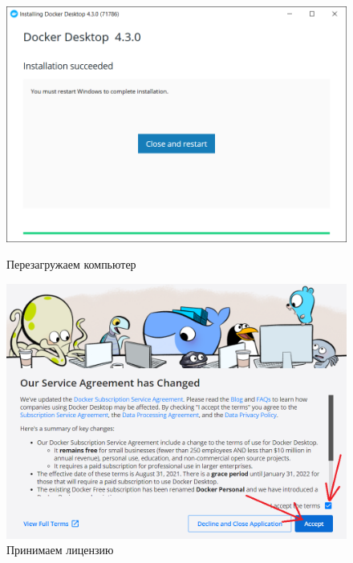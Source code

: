 \begin{figure}[!p]
    \centering
    \begin{minipage}{0.47\textwidth}
        \centering
        \includegraphics[width=\linewidth]
            {_assets/gpi_pz_docker_05.png}
        \caption{Перезагружаем компьютер}
        \label{fig:gpi_pz_docker_05}
    \end{minipage}
    \begin{minipage}{0.47\textwidth}
        \centering
        \includegraphics[width=\linewidth]
            {_assets/gpi_pz_docker_06.png}
        \caption{Принимаем лицензию}
        \label{fig:gpi_pz_docker_06}
    \end{minipage}
\end{figure}

